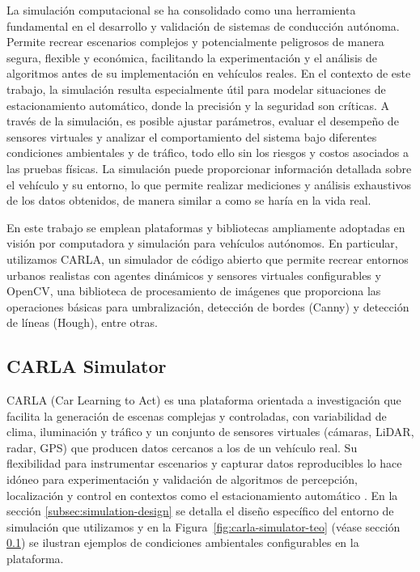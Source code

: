 
La simulación computacional se ha consolidado como una herramienta fundamental
en el desarrollo y validación de sistemas de conducción autónoma.
Permite recrear escenarios complejos y potencialmente peligrosos de manera segura,
flexible y económica, facilitando la experimentación y el análisis de algoritmos
antes de su implementación en vehículos reales. En el contexto de este trabajo,
la simulación resulta especialmente útil para modelar situaciones de estacionamiento
automático, donde la precisión y la seguridad son críticas. A través de la simulación,
es posible ajustar parámetros, evaluar el desempeño de sensores virtuales y analizar el
comportamiento del sistema bajo diferentes condiciones ambientales y de tráfico,
todo ello sin los riesgos y costos asociados a las pruebas físicas.
La simulación puede proporcionar información detallada sobre el vehículo y
su entorno, lo que permite realizar mediciones y análisis exhaustivos de los
datos obtenidos, de manera similar a como se haría en la vida real.

En este trabajo se emplean plataformas y bibliotecas ampliamente adoptadas en visión
por computadora y simulación para vehículos autónomos.
En particular, utilizamos CARLA, un simulador de código abierto que permite recrear entornos urbanos realistas
con agentes dinámicos y sensores virtuales configurables y OpenCV, una biblioteca de procesamiento
de imágenes que proporciona las operaciones básicas para umbralización, detección de bordes (Canny)
y detección de líneas (Hough), entre otras.

\subsection{CARLA Simulator}\label{sec:carla-teorico}

CARLA (Car Learning to Act) es una plataforma orientada a investigación que facilita la generación de escenas
complejas y controladas, con variabilidad de clima, iluminación y tráfico y un conjunto de sensores virtuales
(cámaras, LiDAR, radar, GPS) que producen datos cercanos a los de un vehículo real.
Su flexibilidad para instrumentar escenarios y capturar datos reproducibles lo hace idóneo para
experimentación y validación de algoritmos de percepción, localización y control en contextos como el
estacionamiento automático \cite{dosovitskiy2017carla}.
En la sección \ref{subsec:simulation-design} se detalla el diseño específico del entorno de simulación que
utilizamos y en la Figura~\ref{fig:carla-simulator-teo} (véase sección \ref{sec:carla-teorico}) se ilustran ejemplos
de condiciones ambientales configurables en la plataforma.

